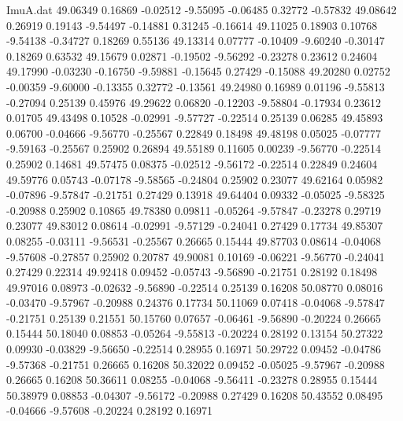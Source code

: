 \begin{filecontents}{ImuA.dat}
  49.06349    0.16869   -0.02512   -9.55095   -0.06485    0.32772   -0.57832
  49.08642    0.26919    0.19143   -9.54497   -0.14881    0.31245   -0.16614
  49.11025    0.18903    0.10768   -9.54138   -0.34727    0.18269    0.55136
  49.13314    0.07777   -0.10409   -9.60240   -0.30147    0.18269    0.63532
  49.15679    0.02871   -0.19502   -9.56292   -0.23278    0.23612    0.24604
  49.17990   -0.03230   -0.16750   -9.59881   -0.15645    0.27429   -0.15088
  49.20280    0.02752   -0.00359   -9.60000   -0.13355    0.32772   -0.13561
  49.24980    0.16989    0.01196   -9.55813   -0.27094    0.25139    0.45976
  49.29622    0.06820   -0.12203   -9.58804   -0.17934    0.23612    0.01705
  49.43498    0.10528   -0.02991   -9.57727   -0.22514    0.25139    0.06285
  49.45893    0.06700   -0.04666   -9.56770   -0.25567    0.22849    0.18498
  49.48198    0.05025   -0.07777   -9.59163   -0.25567    0.25902    0.26894
  49.55189    0.11605    0.00239   -9.56770   -0.22514    0.25902    0.14681
  49.57475    0.08375   -0.02512   -9.56172   -0.22514    0.22849    0.24604
  49.59776    0.05743   -0.07178   -9.58565   -0.24804    0.25902    0.23077
  49.62164    0.05982   -0.07896   -9.57847   -0.21751    0.27429    0.13918
  49.64404    0.09332   -0.05025   -9.58325   -0.20988    0.25902    0.10865
  49.78380    0.09811   -0.05264   -9.57847   -0.23278    0.29719    0.23077
  49.83012    0.08614   -0.02991   -9.57129   -0.24041    0.27429    0.17734
  49.85307    0.08255   -0.03111   -9.56531   -0.25567    0.26665    0.15444
  49.87703    0.08614   -0.04068   -9.57608   -0.27857    0.25902    0.20787
  49.90081    0.10169   -0.06221   -9.56770   -0.24041    0.27429    0.22314
  49.92418    0.09452   -0.05743   -9.56890   -0.21751    0.28192    0.18498
  49.97016    0.08973   -0.02632   -9.56890   -0.22514    0.25139    0.16208
  50.08770    0.08016   -0.03470   -9.57967   -0.20988    0.24376    0.17734
  50.11069    0.07418   -0.04068   -9.57847   -0.21751    0.25139    0.21551
  50.15760    0.07657   -0.06461   -9.56890   -0.20224    0.26665    0.15444
  50.18040    0.08853   -0.05264   -9.55813   -0.20224    0.28192    0.13154
  50.27322    0.09930   -0.03829   -9.56650   -0.22514    0.28955    0.16971
  50.29722    0.09452   -0.04786   -9.57368   -0.21751    0.26665    0.16208
  50.32022    0.09452   -0.05025   -9.57967   -0.20988    0.26665    0.16208
  50.36611    0.08255   -0.04068   -9.56411   -0.23278    0.28955    0.15444
  50.38979    0.08853   -0.04307   -9.56172   -0.20988    0.27429    0.16208
  50.43552    0.08495   -0.04666   -9.57608   -0.20224    0.28192    0.16971

\end{filecontents}
